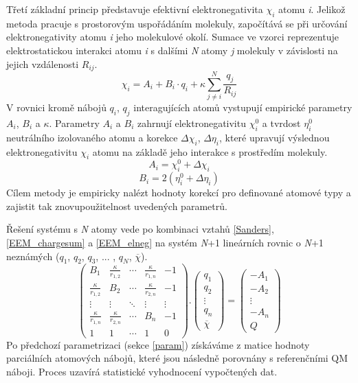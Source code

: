 Třetí základní princip představuje efektivní elektronegativita $\chi_i$ atomu \textit{i}. Jelikož metoda pracuje s prostorovým uspořádáním molekuly, započítává se při určování elektronegativity atomu \textit{i} jeho molekulové okolí. Sumace ve vzorci reprezentuje elektrostatickou interakci atomu \textit{i} s dalšími \textit{N} atomy \textit{j} molekuly  v závislosti na jejich vzdálenosti $R_{ij}$.
\begin{equation}
\label{EEM_elneg}
    \chi_i = A_i + B_i\cdot q_i + \kappa \sum_{j \neq i}^{N} \frac{q_j}{R_{ij}}
\end{equation}
V rovnici kromě nábojů $q_i$, $q_j$ interagujících atomů vystupují empirické parametry $A_i$, $B_i$ a $\kappa$. Parametry  $A_i$ a $B_i$ zahrnují elektronegativitu $\chi_{i}^{0}$ a tvrdost $\eta_{i}^{0}$ neutrálního izolovaného atomu a korekce $\Delta \chi_i$, $\Delta \eta_i$, které upravují výslednou elektronegativitu $\chi_i$ atomu na základě jeho interakce s prostředím molekuly. 
\begin{equation}
    A_i = \chi_{i}^{0} + \Delta \chi_i
\end{equation}
\begin{equation}
        B_i = 2(\eta_{i}^{0} + \Delta \eta_i)
\end{equation}
Cílem metody je empiricky nalézt hodnoty korekcí pro definované atomové typy a zajistit tak znovupoužitelnost uvedených parametrů. 

Řešení systému s \textit{N} atomy vede po kombinaci vztahů  \ref{Sanders}, \ref{EEM_chargesum} a \ref{EEM_elneg} na systém \textit{N}+1 lineárních rovnic o \textit{N}+1 neznámých ($q_1$, $q_2$, $q_3$, ... , $q_N$, $\overline{\chi}$).
\begin{equation}
\label{EEM_matrix}
 \begin{pmatrix}
  B_{1} & \frac{\kappa}{r_{1,2}} & \cdots & \frac{\kappa}{r_{1,n}} & -1\\
  \frac{\kappa}{r_{1,2}} & B_{2} & \cdots & \frac{\kappa}{r_{2,n}} & -1 \\
  \vdots  & \vdots  & \ddots & \vdots & \vdots  \\
  \frac{\kappa}{r_{1,n}} & \frac{\kappa}{r_{2,n}} & \cdots & B_{n} & -1 \\
  1 & 1 & \cdots & 1 & 0
 \end{pmatrix} .
 \begin{pmatrix}
 q_{1} \\ q_{2} \\ \vdots \\ q_{n} \\ \overline{\chi}
 \end{pmatrix} =
 \begin{pmatrix}
 -A_{1} \\ -A_{2} \\ \vdots \\ -A_{n} \\ Q
 \end{pmatrix}
\end{equation}
Po předchozí parametrizaci (sekce \ref{param}) získáváme z matice hodnoty parciálních atomových nábojů, které jsou následně porovnány s referenčními QM náboji. Proces uzavírá statistické vyhodnocení vypočtených dat.

